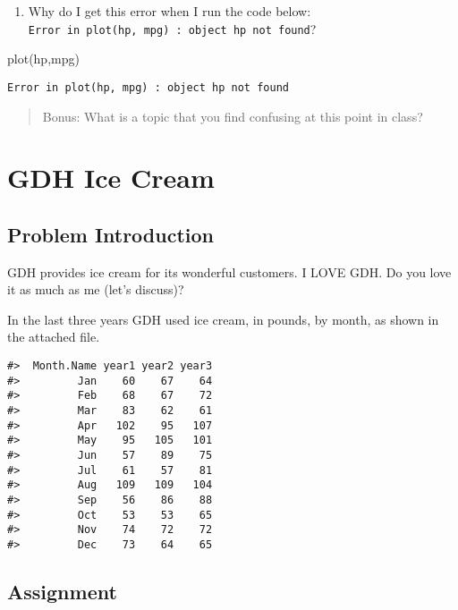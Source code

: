 \documentclass[
]{book}
\newenvironment{Shaded}{\begin{snugshade}}{\end{snugshade}}
\newcommand{\FunctionTok}[1]{\textcolor[rgb]{0.00,0.00,0.00}{#1}}
\newcommand{\NormalTok}[1]{#1}
\providecommand{\tightlist}{%
  \setlength{\itemsep}{0pt}\setlength{\parskip}{0pt}}
\begin{document}
\begin{enumerate}
\def\labelenumi{\arabic{enumi}.}
\setcounter{enumi}{5}
\tightlist
\item
  Why do I get this error when I run the code below: \texttt{Error\ in\ plot(hp,\ mpg)\ :\ object\ \textquotesingle{}hp\textquotesingle{}\ not\ found}?
\end{enumerate}

\begin{Shaded}
\begin{Highlighting}[]
\FunctionTok{plot}\NormalTok{(hp,mpg)}
\end{Highlighting}
\end{Shaded}

\texttt{Error\ in\ plot(hp,\ mpg)\ :\ object\ \textquotesingle{}hp\textquotesingle{}\ not\ found}

\begin{quote}
Bonus: What is a topic that you find confusing at this point in class?
\end{quote}

\hypertarget{gdh-ice-cream}{%
\chapter{GDH Ice Cream}\label{gdh-ice-cream}}

\hypertarget{problem-introduction}{%
\section{Problem Introduction}\label{problem-introduction}}

GDH provides ice cream for its wonderful customers. I LOVE GDH. Do you love it as much as me (let's discuss)?

In the last three years GDH used ice cream, in pounds, by month, as shown in the attached file.

\begin{verbatim}
#>  Month.Name year1 year2 year3
#>         Jan    60    67    64
#>         Feb    68    67    72
#>         Mar    83    62    61
#>         Apr   102    95   107
#>         May    95   105   101
#>         Jun    57    89    75
#>         Jul    61    57    81
#>         Aug   109   109   104
#>         Sep    56    86    88
#>         Oct    53    53    65
#>         Nov    74    72    72
#>         Dec    73    64    65
\end{verbatim}

\hypertarget{assignment}{%
\section{Assignment}\label{assignment}}
\end{document}
